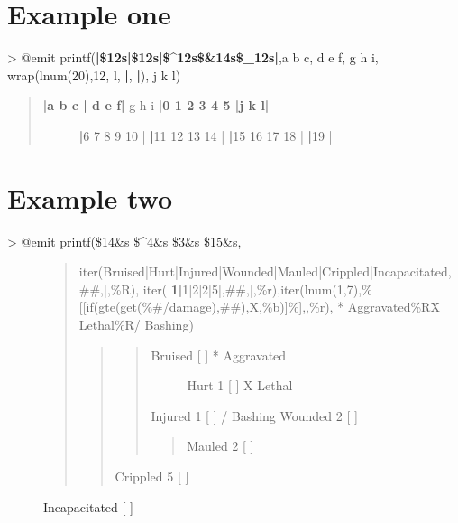 \documentclass[letterpaper,10pt,english]{sphinxmanual}
\begin{document}
\section{Example one}
\label{\detokenize{21-printf:example-one}}
\sphinxAtStartPar
\textgreater{} @emit printf({\color{red}\bfseries{}|\$\sphinxhyphen{}12s|\$12s|\$\textasciicircum{}12s\$\&14s\$\_12s|},a b c, d e f, g h i, wrap(lnum(20),12, l, {\color{red}\bfseries{}|}, {\color{red}\bfseries{}|}), j k l)
\begin{quote}
\begin{description}
\item[{{\color{red}\bfseries{}|a b c       |       d e f|}   g h i    {\color{red}\bfseries{}|0 1 2 3 4 5 |j     k    l|}}] \leavevmode
\sphinxAtStartPar
{\color{red}\bfseries{}|}6 7 8 9 10  |
{\color{red}\bfseries{}|}11 12 13 14 |
{\color{red}\bfseries{}|}15 16 17 18 |
{\color{red}\bfseries{}|}19          |

\end{description}
\end{quote}


\section{Example two}
\label{\detokenize{21-printf:example-two}}\begin{description}
\item[{\textgreater{} @emit printf(\$14\&s \$\textasciicircum{}4\&s \$\sphinxhyphen{}3\&s \$15\&s,}] \leavevmode\begin{quote}

\sphinxAtStartPar
iter(Bruised|Hurt|Injured|Wounded|Mauled|Crippled|Incapacitated,\#\#,|,\%R),
iter({\color{red}\bfseries{}|\sphinxhyphen{}1|}\sphinxhyphen{}1|\sphinxhyphen{}2|\sphinxhyphen{}2|\sphinxhyphen{}5|,\#\#,|,\%r),iter(lnum(1,7),\%{[}{[}if(gte(get(\%\#/damage),\#\#),X,\%b){]}\%{]},,\%r),
* Aggravated\%RX Lethal\%R/ Bashing)
\begin{quote}
\begin{quote}
\begin{description}
\item[{Bruised      {[} {]}    * Aggravated}] \leavevmode
\sphinxAtStartPar
Hurt  \sphinxhyphen{}1  {[} {]}        X Lethal

\end{description}

\sphinxAtStartPar
Injured  \sphinxhyphen{}1  {[} {]}       / Bashing
Wounded  \sphinxhyphen{}2  {[} {]}
\begin{quote}

\sphinxAtStartPar
Mauled  \sphinxhyphen{}2  {[} {]}
\end{quote}
\end{quote}

\sphinxAtStartPar
Crippled  \sphinxhyphen{}5  {[} {]}
\end{quote}
\end{quote}

\sphinxAtStartPar
Incapacitated      {[} {]}

\end{description}
\end{document}
